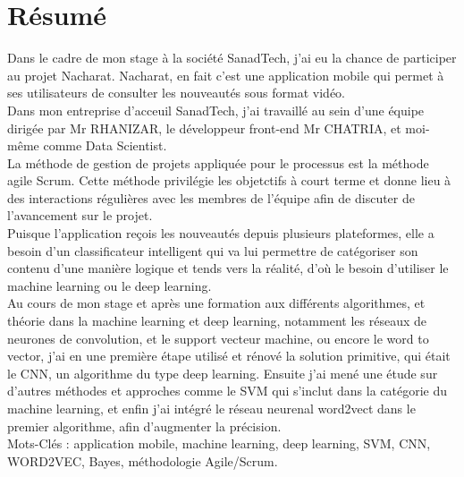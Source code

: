 \documentclass[11pt, oneside]{Thesis} %
\begin{document}
\chapter*{Résumé}
Dans le cadre de mon stage à la société SanadTech, j'ai eu la chance de participer au projet Nacharat. Nacharat, en fait c'est une application mobile qui permet à ses utilisateurs de consulter les nouveautés sous format vidéo.\\
Dans mon entreprise d'acceuil SanadTech, j'ai travaillé au sein d'une équipe dirigée par Mr RHANIZAR, le développeur front-end Mr CHATRIA, et moi-même comme Data Scientist.\\
La méthode de gestion de projets appliquée pour le processus est la méthode agile Scrum. Cette méthode privilégie les objetctifs à court terme et donne lieu à des interactions régulières avec les membres de l'équipe afin de discuter de l'avancement sur le projet.\\
Puisque l'application reçois les nouveautés depuis plusieurs plateformes, elle a besoin d'un classificateur intelligent qui va lui permettre de catégoriser son contenu d'une manière logique et tends vers la réalité, d'où le besoin d'utiliser le machine learning ou le deep learning.\\
Au cours de mon stage et après une formation aux différents algorithmes, et théorie dans la machine learning et deep learning, notamment les réseaux de neurones de convolution, et le support vecteur machine, ou encore le word to vector, j'ai en une première étape utilisé et rénové la solution primitive, qui était le CNN, un algorithme du type deep learning. Ensuite j'ai mené une étude sur d'autres méthodes et approches comme le SVM qui s'inclut dans la catégorie du machine learning, et enfin j'ai intégré le réseau neurenal word2vect dans le premier algorithme, afin d'augmenter la précision.\\[1cm]


Mots-Clés : application mobile, machine learning, deep learning, SVM, CNN, WORD2VEC, Bayes, méthodologie Agile/Scrum.



%

\clearpage %

\clearpage %
\end{document}
